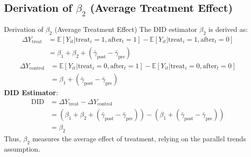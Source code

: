 \documentclass{beamer}
\begin{document}
\subsection{Derivation of $\beta_2$ (Average Treatment Effect)}
\begin{frame}{Derivation of $\beta_2$ (Average Treatment Effect)}
  The DID estimator $\beta_2$ is derived as:
  \begin{align*}
    \Delta Y_{\text{treat}} &= \mathbb{E}[Y_{it} | \text{treat}_i=1, \text{after}_t=1] - \mathbb{E}[Y_{it} | \text{treat}_i=1, \text{after}_t=0] \\
    &= \beta_1 + \beta_2 + (\bar{\gamma}_{\text{post}} - \bar{\gamma}_{\text{pre}})
  \end{align*}
  \begin{align*}
    \Delta Y_{\text{control}} &= \mathbb{E}[Y_{it} | \text{treat}_i=0, \text{after}_t=1] - \mathbb{E}[Y_{it} | \text{treat}_i=0, \text{after}_t=0] \\
    &= \beta_1 + (\bar{\gamma}_{\text{post}} - \bar{\gamma}_{\text{pre}})
  \end{align*}
  \textbf{DID Estimator}:
  \begin{align*}
    \text{DID} &= \Delta Y_{\text{treat}} - \Delta Y_{\text{control}} \\
    &= (\beta_1 + \beta_2 + (\bar{\gamma}_{\text{post}} - \bar{\gamma}_{\text{pre}})) - (\beta_1 + (\bar{\gamma}_{\text{post}} - \bar{\gamma}_{\text{pre}})) \\
    &= \beta_2
  \end{align*}
  Thus, $\beta_2$ measures the average effect of treatment, relying on the parallel trends assumption.
\end{frame}
\end{document}

